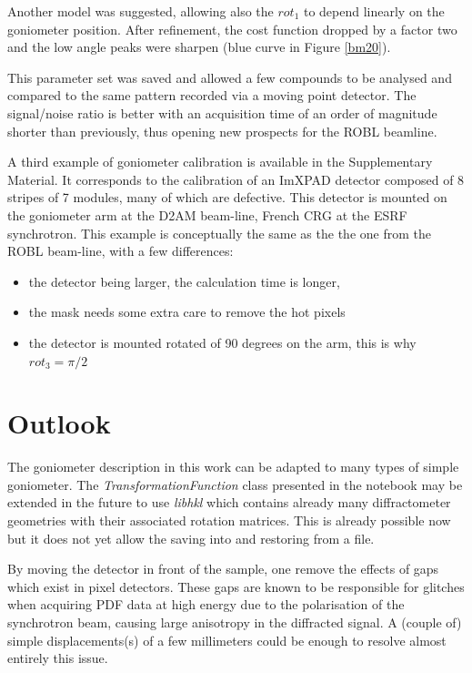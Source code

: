 \documentclass[preprint, pdf]{iucr}              %
\begin{document}
Another model was suggested, allowing also the $rot_1$ to depend linearly on the
goniometer position. 
After refinement, the cost function dropped by a factor two and
the low angle peaks were sharpen (blue curve in Figure \ref{bm20}). 

This parameter set was saved and allowed a few compounds to be analysed and
compared to the same pattern recorded via a moving point detector. 
The signal/noise ratio is better with an acquisition time of an order
of magnitude shorter than previously, thus opening new prospects for
the ROBL beamline.

A third example of goniometer calibration is available in the Supplementary
Material. It corresponds to the calibration of an ImXPAD detector composed
of 8 stripes of 7 modules, many of which are defective.
This detector is mounted on the goniometer arm at the D2AM beam-line, French CRG
at the ESRF synchrotron. 
This example is conceptually the same as the the one from the ROBL beam-line,
with a few differences:
\begin{itemize}
  \item the detector being larger, the calculation time is
longer,
  \item the mask needs some extra care to remove the hot pixels
  \item the detector is mounted rotated of 90 degrees on the arm, this is why
  $rot_3=\pi/2$
\end{itemize}

\section{Outlook}

The goniometer description in this work can be adapted to
many types of simple goniometer.
The \textit{TransformationFunction} class presented in the notebook may be extended
in the future to use \textit{libhkl} \cite{libhkl} which contains already many
diffractometer geometries with their associated rotation matrices. 
This is already possible now but it does not yet allow the saving into and
restoring from a file. 

By moving the detector in front of the sample, one remove the effects of
gaps which exist in pixel detectors.
These gaps are known to be responsible for glitches
when acquiring PDF data at high energy due to the
polarisation of the synchrotron beam, causing large anisotropy in the
diffracted signal. 
A (couple of) simple displacements(s) of a few millimeters could be enough
to resolve almost entirely this issue.
\end{document}
